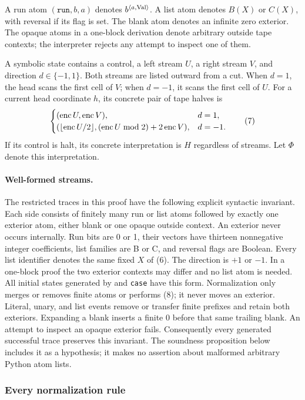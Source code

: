 A run atom $(\texttt{run},b,a)$ denotes $b^{\langle a,\operatorname{Val}\rangle}$.
A list atom denotes $B(X)$ or $C(X)$, with reversal if its flag is set.
The blank atom denotes an infinite zero exterior.  The opaque atoms in a
one-block derivation denote arbitrary outside tape contexts; the
interpreter rejects any attempt to inspect one of them.

A symbolic state contains a control, a left stream $U$, a right stream
$V$, and direction $d\in\{-1,1\}$.  Both streams are listed outward from
a cut.  When $d=1$, the head scans the first cell of $V$; when $d=-1$, it
scans the first cell of $U$.  For a current head coordinate $h$, its
concrete pair of tape halves is
\[
\begin{cases}
(\operatorname{enc} U,\operatorname{enc} V),&d=1,\\
(\lfloor\operatorname{enc} U/2\rfloor,
 (\operatorname{enc} U\bmod2)+2\operatorname{enc} V),&d=-1.
\end{cases}                                                    \tag{7}
\]
If its control is halt, its concrete interpretation is $H$ regardless of
streams.  Let $\Phi$ denote this interpretation.

\paragraph{Well-formed streams.}
The restricted traces in this proof have the following explicit syntactic
invariant.  Each side consists of finitely many run or list atoms followed
by exactly one exterior atom, either blank or one opaque outside context.
An exterior never occurs internally.  Run bits are 0 or 1, their vectors
have thirteen nonnegative integer coefficients, list families are B or C,
and reversal flags are Boolean.  Every list identifier denotes the same
fixed $X$ of (6).  The direction is $+1$ or $-1$.  In a one-block proof
the two exterior contexts may differ and no list atom is needed.
All initial states generated by  and
\texttt{case} have this form.  Normalization only merges or removes
finite atoms or performs (8); it never moves an exterior.  Literal,
unary, and list events remove or transfer finite prefixes and retain
both exteriors.  Expanding a blank inserts a finite 0 before that same
trailing blank.  An attempt to inspect an opaque exterior fails.
Consequently every generated successful trace preserves this invariant.
The soundness proposition below includes it as a hypothesis; it makes
no assertion about malformed arbitrary Python atom lists.

\subsubsection{Every normalization rule}

